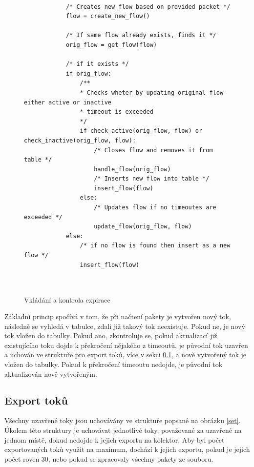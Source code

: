 \documentclass[11pt, a4paper, hidelinks]{article}[08.10.2023]
\begin{document}
     \begin{figure}[ht]
        \centering
        \begin{lstlisting}[style=CStyle]

            /* Creates new flow based on provided packet */
            flow = create_new_flow()

            /* If same flow already exists, finds it */
            orig_flow = get_flow(flow)

            /* if it exists */
            if orig_flow: 
                /**
                * Checks wheter by updating original flow either active or inactive
                * timeout is exceeded
                */
                if check_active(orig_flow, flow) or check_inactive(orig_flow, flow):
                    /* Closes flow and removes it from table */
                    handle_flow(orig_flow)
                    /* Inserts new flow into table */
                    insert_flow(flow)
                else:
                    /* Updates flow if no timeoutes are exceeded */
                    update_flow(orig_flow, flow)
            else:
                /* if no flow is found then insert as a new flow */
                insert_flow(flow)

            
        \end{lstlisting}
        \caption{Vkládání a kontrola expirace}
        \label{pseudo}
    \end{figure}

    \pagebreak

    Základní princip spočívá v tom, že při načtení pakety je vytvořen nový tok, následně se vyhledá v tabulce, zdali již takový tok neexistuje. Pokud ne, je nový tok vložen do tabulky. Pokud ano, zkontroluje se, pokud aktualizací již existujícího toku dojde k překročení nějakého z timeoutů, je původní tok uzavřen a uchován ve struktuře pro export toků, více v sekci \ref{export}, a nově vytvořený tok je vložen do tabulky. Pokud k překročení timeoutu nedojde, je původní tok aktualizován nově vytvořeným.
    
    \subsection{Export toků}\label{export}
        Všechny uzavřené toky jsou uchovávány ve struktuře popsané na obrázku \ref{set}. Úkolem této struktury je uchovávat jednotlivé toky, považované za uzavřené na jednom místě, dokud nedojde k jejich exportu na kolektor. Aby byl počet exportovaných toků využit na maximum, dochází k jejich exportu, pokud je jejich počet roven 30, nebo pokud se zpracovaly všechny pakety ze souboru. 
\end{document}

